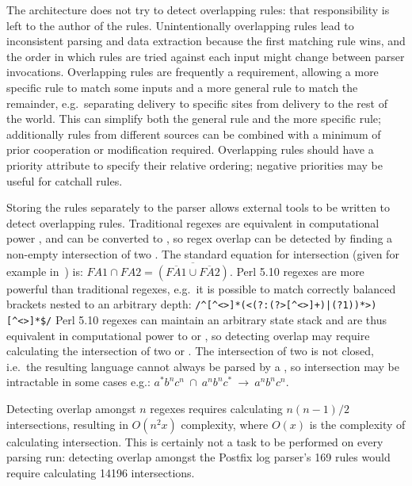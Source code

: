 \documentclass{svmult}
\newcommand{\tab}[0]{%
    \hspace*{2em}%
}
\newcommand{\numberOFrules}[0]{%
    169%
}
\newcommand{\numberOFruleINTERSECTIONS}[0]{%
    14196%
}
\begin{document}
The architecture does not try to detect overlapping rules: that
responsibility is left to the author of the rules.  Unintentionally
overlapping rules lead to inconsistent parsing and data extraction because
the first matching rule wins, and the order in which rules are tried
against each input might change between parser invocations.  Overlapping
rules are frequently a requirement, allowing a more specific rule to match
some inputs and a more general rule to match the remainder, e.g.\
separating \SMTP{} delivery to specific sites from \SMTP{} delivery to the
rest of the world.  This can simplify both the general rule and the more
specific rule; additionally rules from different sources can be combined
with a minimum of prior cooperation or modification required.  Overlapping
rules should have a priority attribute to specify their relative ordering;
negative priorities may be useful for catchall rules.

Storing the rules separately to the parser allows external tools to be
written to detect overlapping rules.  Traditional regexes are equivalent in
computational power \FA{}, and can be converted to \FA{}, so regex overlap
can be detected by finding a non-empty intersection of two \FA{}\@.  The
standard equation for \FA{} intersection (given for example
in~\cite{intersection-of-NFA-using-Z}) is: $FA1 \cap{} FA2 =
\overline{(\overline{FA1} \cup{} \overline{FA2})}$.  Perl 5.10 regexes are
more powerful than traditional regexes, e.g.\ it is possible to match
correctly balanced brackets nested to an arbitrary depth:
\newline{}\tab{}\verb!/^[^<>]*(<(?:(?>[^<>]+)|(?1))*>)[^<>]*$/!\newline{}
Perl 5.10 regexes can maintain an arbitrary state stack and are thus
equivalent in computational power to \PDA{} or \CFL{}, so detecting overlap
may require calculating the intersection of two \PDA{} or \CFL{}\@.  The
intersection of two \CFL{} is not closed, i.e.\ the resulting language
cannot always be parsed by a \CFL{}, so intersection may be
intractable in some cases e.g.:
$a^{*}b^{n}c^{n}~\cap~a^{n}b^{n}c^{*}~\rightarrow~a^{n}b^{n}c^{n}$.

Detecting overlap amongst $n$ regexes requires calculating $n(n-1)/2$
intersections, resulting in $O(n^2x)$ complexity, where $O(x)$ is the
complexity of calculating intersection.  This is certainly not a task to be
performed on every parsing run: detecting overlap amongst the Postfix log
parser's \numberOFrules{} rules would require calculating
\numberOFruleINTERSECTIONS{} intersections.
\end{document}
